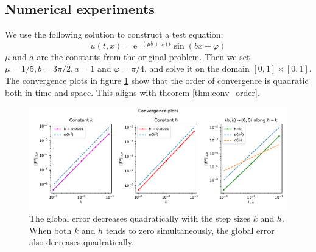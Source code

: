 \subsection{Numerical experiments}
We use the following solution to construct a test equation:
\begin{equation}
  \tilde{u}(t, x) = \text{e}^{-(\mu b + a)t} \sin (bx + \varphi)
\end{equation}
\( \mu  \) and \( a \) are the constants from the original problem.
Then we set \( \mu = 1/5, b = 3\pi/2, a = 1 \) and \( \varphi = \pi/4 \),
and solve it on the domain \( [0,1] \times [0,1] \).
The convergence plots in figure \ref{fig:conv_plot}
show that the order of convergence is quadratic both in
time and space.
This aligns with theorem \ref{thm:conv_order}.
\begin{figure}[!h]
    \centering
    \includegraphics[width=\textwidth]{Images/plots/task1_error.pdf}
    \caption{ The global error decreases quadratically
      with the step sizes \( k \) and \( h \).
      When both \( k \) and \( h \) tends to zero
      simultaneously, the global error also
      decreases quadratically.
    }
    \label{fig:conv_plot}
\end{figure}
